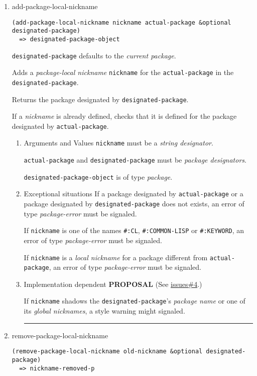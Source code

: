 \documentclass[11pt]{article}
\begin{document}
\begin{enumerate}
\begin{enumerate}
\noindent\rule{\textwidth}{0.5pt}
\end{enumerate}
\item add-package-local-nickname
\label{sec:orgee3beb5}
\begin{verbatim}
(add-package-local-nickname nickname actual-package &optional designated-package)
  => designated-package-object
\end{verbatim}

\texttt{designated-package} defaults to the \emph{current package}.

Adds a \emph{package-local nickname} \texttt{nickname} for the \texttt{actual-package} in the
\texttt{designated-package}.

Returns the package designated by \texttt{designated-package}.

If a \emph{nickname} is already defined, checks that it is defined for the
package designated by \texttt{actual-package}.
\begin{enumerate}
\item Arguments and Values
\label{sec:orgb5eccfb}
\texttt{nickname} must be a \emph{string designator}.

\texttt{actual-package} and \texttt{designated-package} must be \emph{package designators}.

\texttt{designated-package-object} is of type \emph{package}.
\item Exceptional situations
\label{sec:orgd658e00}
If a package designated by \texttt{actual-package} or a package designated by
\texttt{designated-package} does not exists, an error of type \emph{package-error}
must be signaled.

If \texttt{nickname} is one of the names \texttt{\#:CL}, \texttt{\#:COMMON-LISP} or \texttt{\#:KEYWORD},
an error of type \emph{package-error} must be signaled.

If \texttt{nickname} is a \emph{local nickname} for a package different from
\texttt{actual-package}, an error of type \emph{package-error} must be signaled.
\item Implementation dependent
\label{sec:org8d26bb3}
\textbf{PROPOSAL} (See \hyperref[sec:orge0b4034]{issues\#4}.)

If \texttt{nickname} shadows the \texttt{designated-package}'s \emph{package name} or one of
its \emph{global nicknames}, a style warning might signaled.

\noindent\rule{\textwidth}{0.5pt}
\end{enumerate}
\item remove-package-local-nickname
\label{sec:org3792117}
\begin{verbatim}
(remove-package-local-nickname old-nickname &optional designated-package)
  => nickname-removed-p
\end{verbatim}


\end{enumerate}
\end{document}

